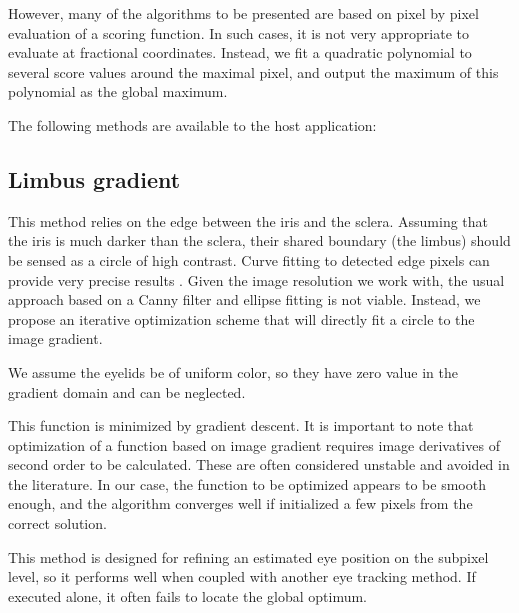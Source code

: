 However, many of the algorithms to be presented are based on pixel by pixel evaluation of a scoring function.
In such cases, it is not very appropriate to evaluate at fractional coordinates.
Instead, we fit a quadratic polynomial to several score values around the maximal pixel, and output the maximum of this polynomial as the global maximum.

The following methods are available to the host application:

\subsection{Limbus gradient}
This method relies on the edge between the iris and the sclera.
Assuming that the iris is much darker than the sclera, their shared boundary (the limbus) should be sensed as a circle of high contrast.
Curve fitting to detected edge pixels can provide very precise results \cite{kassner14}.
Given the image resolution we work with, the usual approach based on a Canny filter and ellipse fitting is not viable.
Instead, we propose an iterative optimization scheme that will directly fit a circle to the image gradient.

We assume the eyelids be of uniform color, so they have zero value in the gradient domain and can be neglected.

This function is minimized by gradient descent.
It is important to note that optimization of a function based on image gradient requires image derivatives of second order to be calculated.
These are often considered unstable and avoided in the literature.
In our case, the function to be optimized appears to be smooth enough, and the algorithm converges well if initialized a few pixels from the correct solution.

This method is designed for refining an estimated eye position on the subpixel level, so it performs well when coupled with another eye tracking method.
If executed alone, it often fails to locate the global optimum.



